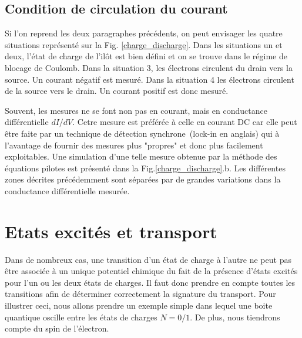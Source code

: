 \subsection{Condition de circulation du courant}

Si l'on reprend les deux paragraphes précédents, on peut envisager les quatre situations représenté sur la Fig. \ref{charge_discharge}. Dans les situations un et deux, l'état de charge de l'il\^ot est bien défini et on se trouve dans le régime de blocage de Coulomb. Dans la situation 3, les électrons circulent du drain vers la source. Un courant négatif est mesuré. Dans la situation 4 les électrons circulent de la source vers le drain. Un courant positif est donc mesuré.

Souvent, les mesures ne se font non pas en courant, mais en conductance différentielle $dI/dV$. Cetre mesure est préférée à celle en courant DC car elle peut \^etre faite par un technique de détection synchrone~(lock-in en anglais) qui à l'avantage de fournir des mesures plus "propres" et donc plus facilement exploitables. Une simulation d'une telle mesure obtenue par la méthode des équations pilotes est présenté dans la  Fig.\ref{charge_discharge}.b. Les différentes zones décrites précédemment sont séparées par de grandes variations dans la conductance différentielle mesurée.\newline





\section{Etats excités et transport}

Dans de nombreux cas, une transition d'un état de charge à l'autre ne peut pas être associée à un unique potentiel chimique du fait de la présence d'états excités pour l'un ou les deux états de charges. Il faut donc prendre en compte toutes les transitions afin de déterminer correctement la signature du transport. Pour illustrer ceci, nous allons prendre un exemple simple dans lequel une boite quantique oscille entre les états de charges $N=0/1$. De plus, nous tiendrons compte du spin de l'électron. 

